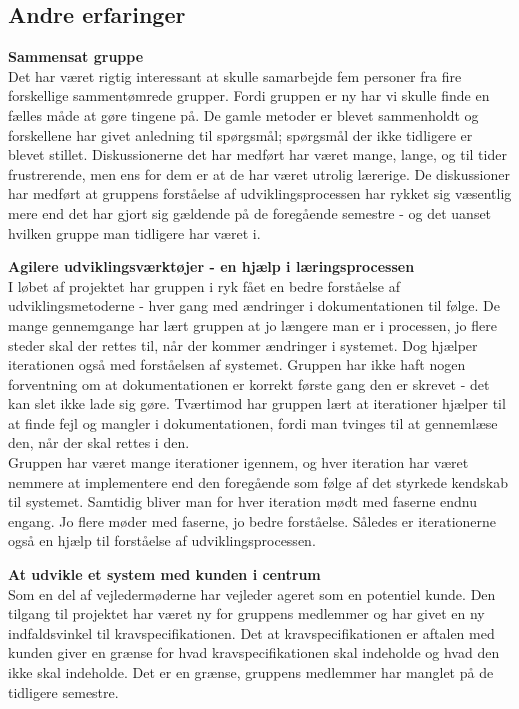\subsection{Andre erfaringer}
\textbf{Sammensat gruppe}\\
Det har været rigtig interessant at skulle samarbejde fem personer fra fire forskellige sammentømrede grupper. Fordi gruppen er ny har vi skulle finde en fælles måde at gøre tingene på. De gamle metoder er blevet sammenholdt og forskellene har givet anledning til spørgsmål; spørgsmål der ikke tidligere er blevet stillet. Diskussionerne det har medført har været mange, lange, og til tider frustrerende, men ens for dem er at de har været utrolig lærerige. De diskussioner har medført at gruppens forståelse af udviklingsprocessen har rykket sig væsentlig mere end det har gjort sig gældende på de foregående semestre - og det uanset hvilken gruppe man tidligere har været i.

\textbf{Agilere udviklingsværktøjer - en hjælp i læringsprocessen}\\
I løbet af projektet har gruppen i ryk fået en bedre forståelse af udviklingsmetoderne - hver gang med ændringer i dokumentationen til følge. De mange gennemgange har lært gruppen at jo længere man er i processen, jo flere steder skal der rettes til, når der kommer ændringer i systemet. Dog hjælper iterationen også med forståelsen af systemet. Gruppen har ikke haft nogen forventning om at dokumentationen er korrekt første gang den er skrevet - det kan slet ikke lade sig gøre. Tværtimod har gruppen lært at iterationer hjælper til at finde fejl og mangler i dokumentationen, fordi man tvinges til at gennemlæse den, når der skal rettes i den.\\
Gruppen har været mange iterationer igennem, og hver iteration har været nemmere at implementere end den foregående som følge af det styrkede kendskab til systemet. Samtidig bliver man for hver iteration mødt med faserne endnu engang. Jo flere møder med faserne, jo bedre forståelse. Således er iterationerne også en hjælp til forståelse af udviklingsprocessen.


\textbf{At udvikle et system med kunden i centrum}\\
Som en del af vejledermøderne har vejleder ageret som en potentiel kunde. Den tilgang til projektet har været ny for gruppens medlemmer og har givet en ny indfaldsvinkel til kravspecifikationen. Det at kravspecifikationen er aftalen med kunden giver en grænse for hvad kravspecifikationen skal indeholde og hvad den ikke skal indeholde. Det er en grænse, gruppens medlemmer har manglet på de tidligere semestre.